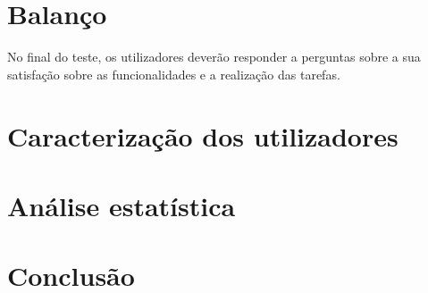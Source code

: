 \documentclass[a4paper]{article}
\begin{document}

  \section{Balanço}

  No final do teste, os utilizadores deverão responder a
  perguntas sobre a sua satisfação sobre as funcionalidades e a
  realização das tarefas.

  \section{Caracterização dos utilizadores}

  

  \section{Análise estatística}



  \section{Conclusão}

  
\end{document}

